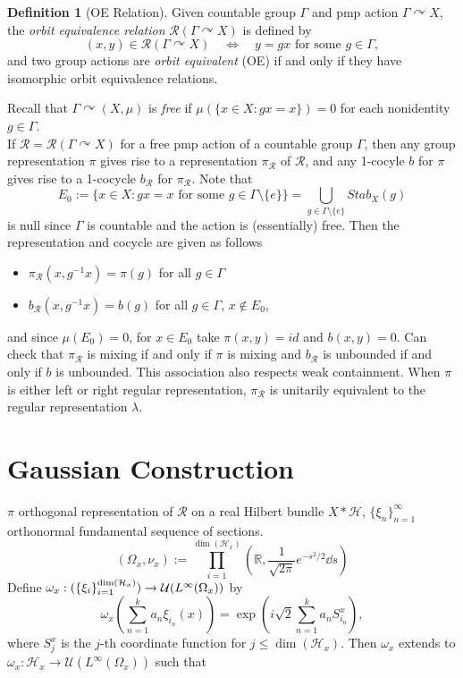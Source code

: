 \documentclass[12pt]{article}
\newcommand{\lr}[1]{\left(#1\right)}
\newcommand{\R}{\mathbb{R}\xspace}
\renewcommand{\H}{\mathcal{H}}
\let\Span\relax
\DeclareMathOperator{\Span}{Span}
\newcommand{\acts}{\curvearrowright}
\theoremstyle{definition}
\newtheorem{definition}{Definition}[]
\theoremstyle{plain}
\theoremstyle{remark}
\begin{document}
\begin{definition}[OE Relation]
    Given countable group $ \Gamma $ and pmp action $ \Gamma\acts X $, the \textit{orbit equivalence relation} $\mathcal{R}(\Gamma\acts X)$ is defined by
    \[
        (x,y)\in \mathcal{R}(\Gamma\acts X)\quad\iff\quad y = gx \text{ for some } g\in \Gamma,
    \]
    and two group actions are \textit{orbit equivalent} (OE) if and only if they have isomorphic orbit equivalence relations.
    

\end{definition}

Recall that $ \Gamma\acts(X,\mu) $ is \textit{free} if $ \mu(\{x\in X: gx = x\}) = 0 $ for each nonidentity $ g\in \Gamma $.\\

If $ \mathcal{R} = \mathcal{R}(\Gamma\acts X) $ for a free pmp action of a countable group $ \Gamma $, then any group representation $ \pi $ gives rise to a representation $ \pi_{\mathcal{R}} $ of $ \mathcal{R} $, and any 1-cocyle $ b $ for $ \pi $ gives rise to a 1-cocycle $ b_{\mathcal{R}} $ for $ \pi_{\mathcal{R}} $. Note that
\[
    E_{0} := \{x\in X: gx = x \text{ for some } g\in \Gamma\setminus\{e\}\} = \bigcup_{g\in \Gamma\setminus\{e\}}Stab_{X}(g)
\]
is null since $ \Gamma $ is countable and the action is (essentially) free. Then the representation and cocycle are given as follows

\begin{itemize}
    \item $ \pi_{\mathcal{R}}(x,g^{-1}x) = \pi(g) $ for all $ g\in \Gamma $
    \item $ b_{\mathcal{R}}(x,g^{-1}x) = b(g) $ for all $ g\in \Gamma $, $ x\not\in E_{0} $,
\end{itemize}
and since $ \mu(E_{0}) = 0 $, for $ x\in E_{0} $ take $ \pi(x,y) = id $ and $ b(x,y) = 0 $. Can check that $ \pi_{\mathcal{R}} $ is mixing if and only if $ \pi $ is mixing and $ b_{\mathcal{R}} $ is unbounded if and only if $ b $ is unbounded. This association also respects weak containment. When $ \pi $ is either left or right regular representation, $ \pi_{\mathcal{R}} $ is unitarily equivalent to the regular representation $ \lambda $.

\section{Gaussian Construction}

$ \pi $ orthogonal representation of $ \mathcal{R} $ on a real Hilbert bundle $ X\ast\H $, $ \{\xi_{n}\}_{n=1}^{\infty} $ orthonormal fundamental sequence of sections.
\[
    (\Omega_{x},\nu_{x}) := \prod_{i=1}^{\dim(\H_{x})} \lr{\R, \frac{1}{\sqrt{2\pi}}e^{-s^{2}/2}\dd{s}}
\]
Define $ \omega_{x}:\Span(\{\xi_{i}\}_{i=1}^{\dim(\H_{x})})\to \mathcal{U}(L^{\infty}(\Omega_{x})) $ by 
\[
    \omega_{x}\lr{\sum_{n=1}^{k}a_{n} \xi_{i_{n}}(x)} = \exp\lr{i \sqrt{2}\sum_{n=1}^{k}a_{n}S_{i_{n}}^{x}},
\]
where $ S^{x}_{j} $ is the $ j $-th coordinate function for $ j\leq \dim(\H_{x}) $. Then $ \omega_{x} $ extends to $ \omega_{x}:\H_{x}\to \mathcal{U}(L^{\infty}(\Omega_{x})) $ such that 
\end{document}

